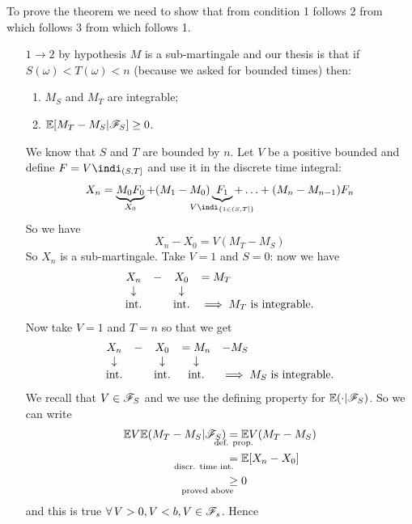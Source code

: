 \documentclass{report}
\begin{document}
\begin{fancyproof}
	To prove the theorem we need to show that from condition 1 follows 2 from which follows 3 from which follows 1.
	\begin{enumerate}
		\item[$1\to 2$] by hypothesis $M$ is a sub-martingale and our thesis is that if $S(\omega)<T(\omega)<n$ (because we asked for bounded times) then:
		\begin{enumerate}
			\item $M_{S}$ and $M_{T}$ are integrable;
			\item $\mathbb{E}[M_{T}-M_{S}|\mathscr{F}_{S}]\geq0$.
		\end{enumerate}
		We know that $S$ and $T$ are bounded by $n$. Let $V$ be a positive bounded \rv{} and define $F=V\indi_{(S,T]}$ and use it in the discrete time integral:
		\[X_{n}=\underbrace{M_0F_0}_{X_0}+(M_1-M_0)\underbrace{F_1}_{\mathclap{V\indi_{\{1\in(S,T]\}}}}+\ldots+(M_{n}-M_{n-1})F_{n}\]
		So we have 
		\[X_{n}-X_{0}=V(M_{T}-M_{S})\]
		So $X_{n}$ is a sub-martingale. Take $V=1$ and $S=0$: now we have
		\begin{equation*}
			\begin{array}{c c c l}
				X_{n}&-&X_{0}&=M_{T}\\
				\downarrow&&\downarrow&\\
				\text{int.}&&\text{int.}&\implies M_{T}\text{ is integrable}.
			\end{array}
		\end{equation*}
		Now take $V=1$ and $T=n$ so that we get
		\begin{equation*}
			\begin{array}{c c c c l}
				X_{n}&-&X_{0}&=M_{n}&-M_{S}\\
				\downarrow&&\downarrow&\downarrow&\\
				\text{int.}&&\text{int.}&\text{int.}&\implies M_{S}\text{ is integrable}.
			\end{array}
		\end{equation*}
		We recall that $V\in\mathscr{F}_S$ and we use the defining property for $\mathbb{E}(\cdot|\mathscr{F}_S)$. So we can write
		\begin{align*}
			\ev V\ev(M_{T}-M_{S}|\F_{S})&\underset{\mathclap{\text{def. prop.}}}{=}\ev V(M_{T}-M_{S})\\
			&\underset{\mathllap{\text{discr. time int.}}}{=}\ev[X_{n}-X_{0}]\\
			&\underset{\mathllap{\text{proved above}}}{\geq}0
		\end{align*}
		and this is true $\forall\, V>0,V<b,V\in\mathscr{F}_{s}$. Hence

\end{enumerate}
\end{fancyproof}
\end{document}
